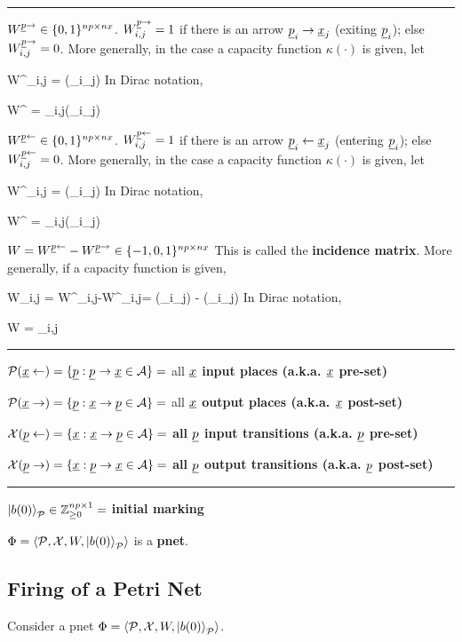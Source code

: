 \hrule
$W^{\rvp\rarrow} \in \bool^{np\times nx}$. 
$W^{\rvp\rarrow}_{i,j} = 1$ if there is an arrow $\rvp_i\rarrow\rvx_j$
(exiting $\rvp_i$);
else $W^{\rvp\rarrow}_{i,j} = 0$. More generally, in the case a capacity function $\kappa(\cdot)$ is given, let

\beq
W^{\rvp\rarrow}_{i,j} = \kappa(\rvp_i\rarrow \rvx_j)
\eeq
In Dirac notation, 

\beq
W^{\rvp\rarrow} = \sum_{i,j}\kappa(\rvp_i\rarrow \rvx_j)
\eeq


$W^{\rvp\larrow} \in \bool^{np\times nx}$. 
$W^{\rvp\larrow}_{i,j} = 1$ if there is an arrow $\rvp_i\larrow\rvx_j$
(entering $\rvp_i$);
else $W^{\rvp\larrow}_{i,j} = 0$. More generally, in the case a capacity function $\kappa(\cdot)$ is given, let

\beq
W^{\rvp\larrow}_{i,j} = \kappa(\rvp_i\larrow \rvx_j)
\eeq
In Dirac notation, 

\beq
W^{\rvp\larrow} = \sum_{i,j}\kappa(\rvp_i\larrow \rvx_j)
\eeq

$W =W^{\rvp\larrow}-W^{\rvp\rarrow}\in \{-1, 0, 1\}^{np\times nx}$ This is called the {\bf incidence matrix}.
More generally, if a capacity function is given, 

\beq
W_{i,j} =
 W^{\rvp\larrow}_{i,j}-W^{\rvp\rarrow}_{i,j}=
\kappa(\rvp_i\larrow \rvx_j)
-
\kappa(\rvp_i\rarrow \rvx_j)
\eeq
In Dirac notation, 

\beq
W =  \sum_{i,j}
\eeq

\hrule
$\calp(\rvx\larrow) = \{\rvp : \rvp \rarrow \rvx\in\cala\}=$ all {\bf $\rvx$ input places (a.k.a. $\rvx$ pre-set)}

$\calp(\rvx\rarrow) = \{\rvp : \rvx \rarrow \rvp \in \cala\}=$ all {\bf $\rvx$ output places (a.k.a. $\rvx$ post-set)}

$\calx(\rvp\larrow) = \{\rvx : \rvx \rarrow \rvp \in \cala \}=$ {\bf all
$\rvp$ input transitions (a.k.a. $\rvp$ pre-set)}

$\calx(\rvp\rarrow) = \{\rvx : \rvp \rarrow\rvx \in\cala\}=$ {\bf all $\rvp$ output transitions (a.k.a. $\rvp$ post-set)}

\hrule
$\left|b(0)\right\rangle_{\cal P}\in {\mathbb{Z}}_{\geq 0}^{np\times 1} =$ {\bf initial marking}

$\Phi = \left\langle{\cal P}, {\cal X}, W,\left|b(0)\right\rangle_{\cal P}\right\rangle$ is a {\bf pnet}.
\subsection{Firing of a Petri Net}
Consider a pnet $\Phi = \left\langle{\cal P}, {\cal X}, W,\left|b(0)\right\rangle_{\cal P}\right\rangle$.

